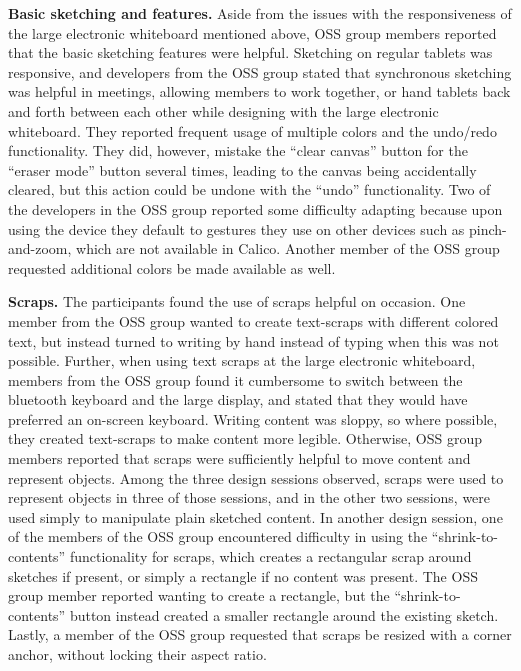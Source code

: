 \textbf{Basic sketching and features.} Aside from the issues with the responsiveness of the large electronic whiteboard mentioned above, OSS group members reported that the basic sketching features were helpful. Sketching on regular tablets was responsive, and developers from the OSS group stated that synchronous sketching was helpful in meetings, allowing members to work together, or hand tablets back and forth between each other while designing with the large electronic whiteboard. They reported frequent usage of multiple colors and the undo/redo functionality.  They did, however, mistake the ``clear canvas'' button for the ``eraser mode'' button several times, leading to the canvas being accidentally cleared, but this action could be undone with the ``undo'' functionality. Two of the developers in the OSS group reported some difficulty adapting because upon using the device they default to gestures they use on other devices such as pinch-and-zoom, which are not available in Calico. Another member of the OSS group requested additional colors be made available as well.

\textbf{Scraps.} The participants found the use of scraps helpful on occasion. One member from the OSS group wanted to create text-scraps with different colored text, but instead turned to writing by hand instead of typing when this was not possible. Further, when using text scraps at the large electronic whiteboard, members from the OSS group found it cumbersome to switch between the bluetooth keyboard and the large display, and stated that they would have preferred an on-screen keyboard. Writing content was sloppy, so where possible, they created text-scraps to make content more legible. Otherwise, OSS group members reported that scraps were sufficiently helpful to move content and represent objects. Among the three design sessions observed, scraps were used to represent objects in three of those sessions, and in the other two sessions, were used simply to manipulate plain sketched content.  In another design session, one of the members of the OSS group encountered difficulty in using the ``shrink-to-contents'' functionality for scraps, which creates a rectangular scrap around sketches if present, or simply a rectangle if no content was present. The OSS group member reported wanting to create a rectangle, but the ``shrink-to-contents'' button instead created a smaller rectangle around the existing sketch. Lastly, a member of the OSS group requested that scraps be resized with a corner anchor, without locking their aspect ratio.

